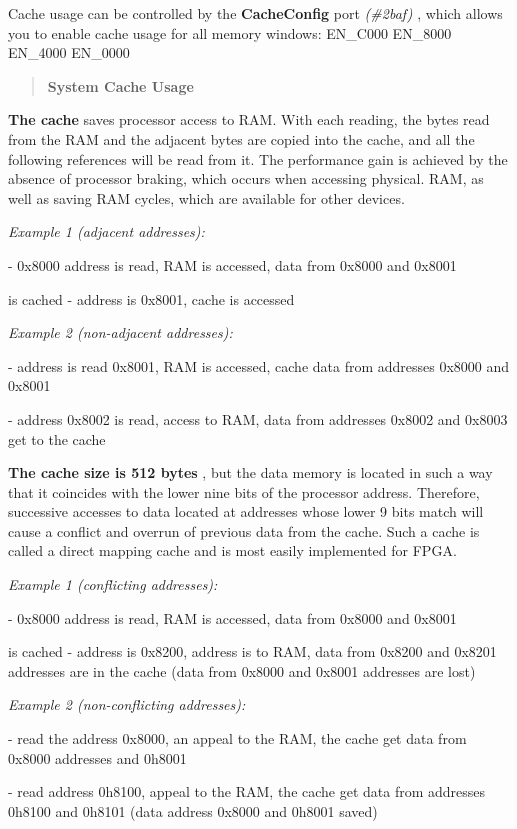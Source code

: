 \documentclass{article}
\begin{document}
Cache usage can be controlled by the \textbf{CacheConfig} port
\emph{(\#2baf)} , which allows you to enable cache usage for all
memory windows: EN\_C000 EN\_8000 EN\_4000 EN\_0000

\begin{quotation}
  \textbf{System Cache Usage}
\end{quotation}
\textbf{The cache} saves processor access to RAM. With each reading,
the bytes read from the RAM and the adjacent bytes are copied into the
cache, and all the following references will be read from it. The
performance gain is achieved by the absence of processor braking,
which occurs when accessing physical. RAM, as well as saving RAM
cycles, which are available for other devices.

\emph{Example 1 (adjacent addresses):}

- 0x8000 address is read, RAM is accessed, data from 0x8000 and 0x8001

is cached - address is 0x8001, cache is accessed

\emph{Example 2 (non-adjacent addresses):}

- address is read 0x8001, RAM is accessed, cache data from addresses
0x8000 and 0x8001

- address 0x8002 is read, access to RAM, data from addresses 0x8002
and 0x8003 get to the cache

\textbf{The cache size is 512 bytes} , but the data memory is located
in such a way that it coincides with the lower nine bits of the
processor address. Therefore, successive accesses to data located at
addresses whose lower 9 bits match will cause a conflict and overrun
of previous data from the cache. Such a cache is called a direct
mapping cache and is most easily implemented for FPGA.

\emph{Example 1 (conflicting addresses):}

- 0x8000 address is read, RAM is accessed, data from 0x8000 and 0x8001

is cached - address is 0x8200, address is to RAM, data from 0x8200 and
0x8201 addresses are in the cache (data from 0x8000 and 0x8001
addresses are lost)

\emph{Example 2 (non-conflicting addresses):}

- read the address 0x8000, an appeal to the RAM, the cache get data
from 0x8000 addresses and 0h8001

- read address 0h8100, appeal to the RAM, the cache get data from
addresses 0h8100 and 0h8101 (data address 0x8000 and 0h8001 saved)
\end{document}
